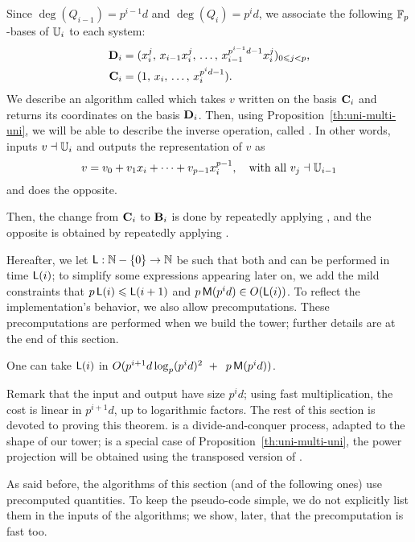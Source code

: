 Since $\deg(Q_{i-1})=p^{i-1}d$ and $\deg(Q_{i})=p^id$, we associate
the following $\mathbb{F}_p$-bases of $\mathbb{U}_i$ to each system:
\begin{align}
  \label{eq:73}
  \mathbf{D}_i &= (x_i^j,\,x_{i-1}x_i^j,\,\ldots,\,x_{i-1}^{p^{i-1}d-1}x_i^j)_{0 \leqslant j < p}\text{,}\\
  \label{eq:bases}
  \mathbf{C}_i &= (1,\,x_i,\,\ldots,\,x_i^{p^id-1})\text{.}  
\end{align}
We describe an algorithm called  which takes $v$
written on the basis $\mathbf{C}_i$ and returns its coordinates on the
basis $\mathbf{D}_i$. Then, using Proposition~\ref{th:uni-multi-uni},
we will be able to describe the inverse operation, called
.  In other words,  inputs $v\dashv\mathbb{U}_i$ and
outputs the representation of $v$ as
\begin{equation}
  \label{eq:vectorspace}
  v = v_0 + v_1x_i + \cdots + v_{p-1}x_i^{p-1}, \quad\text{with all~} v_j \dashv \mathbb{U}_{i-1}
\end{equation}
and  does the opposite.

Then, the change from $\mathbf{C}_i$ to $\mathbf{B}_i$ is done by
repeatedly applying , and the opposite is obtained by
repeatedly applying .

Hereafter, we let $\mathsf{L}:\mathbb{N}-\{0\} \to \mathbb{N}$ be such that both
 and  can be performed in time $\mathsf{L}(i)$; to
simplify some expressions appearing later on, we add the mild
constraints that $p\,\mathsf{L}(i) \leqslant \mathsf{L}(i+1)$ and $p\,\mathsf{M}(p^{i}d)
\in O(\mathsf{L}(i))$.
To reflect the implementation's behavior, we also allow
precomputations. These precomputations are performed when we build
the tower; further details are at the end of this section.
\begin{theorem}\label{theo:L}
  One can take $\mathsf{L}(i)$ in $O( p^{i+1}d\log_p(p^id)^2 \ + \
\,p\,\mathsf{M}(p^{i}d))$.
\end{theorem}
Remark that the input and output have size $p^id$; using fast
multiplication, the cost is linear in $p^{i+1}d$, up to logarithmic
factors. The rest of this section is devoted to proving this theorem.
\alg{Push-down} is a divide-and-conquer process, adapted to the shape
of our tower; \alg{Lift-up} is a special case of
Proposition~\ref{th:uni-multi-uni}, the power projection will be
obtained using the transposed version of \alg{Push-down}.

As said before, the algorithms of this section (and of the following
ones) use precomputed quantities. To keep the pseudo-code simple, we
do not explicitly list them in the inputs of the algorithms;
we show, later, that the precomputation is fast too.

